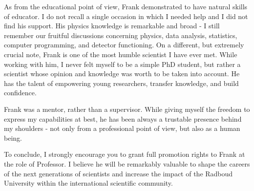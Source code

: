\documentclass[11pt, a4paper]{\TEXPATH awesome-cv}
\begin{document}
\begin{cvletter}
  As from the educational point of view, Frank demonstrated to have natural
  skills of educator. I do not recall a single occasion in which I needed
  help and I did not find his support. His physics knowledge is remarkable
  and broad - I still remember our fruitful discussions concerning physics,
  data analysis, statistics, computer programming, and detector functioning.
  On a different, but extremely crucial note, Frank is one of the most humble
  scientist I have ever met. While working with him, I never felt myself to
  be a simple PhD student, but rather a scientist whose opinion and knowledge
  was worth to be taken into account. He has the talent of empowering young
  researchers, transfer knowledge, and build confidence.
  
  Frank was a mentor, rather than a supervisor. While giving myself the
  freedom to express my capabilities at best, he has been always a trustable
  presence behind my shoulders - not only from a professional point of view,
  but also as a human being.
  
  To conclude, I strongly encourage you to grant full promotion rights to Frank
  at the role of Professor. I believe he will be remarkably valuable to shape
  the careers of the next generations of scientists and increase the impact of
  the Radboud University within the international scientific community.
  
\end{cvletter}


\makeletterclosing %
\end{document}
